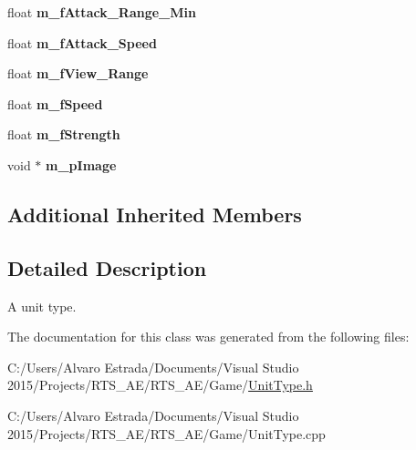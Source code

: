 \begin{DoxyCompactItemize}
\item 
float {\bfseries m\+\_\+f\+Attack\+\_\+\+Range\+\_\+\+Min}\hypertarget{class_c_unit_type_a73c78fc1d0e1d9dfe9adf9e514e7ca8e}{}\label{class_c_unit_type_a73c78fc1d0e1d9dfe9adf9e514e7ca8e}

\item 
float {\bfseries m\+\_\+f\+Attack\+\_\+\+Speed}\hypertarget{class_c_unit_type_ab1367e5b8d1bfc56b0f6943ec82cff84}{}\label{class_c_unit_type_ab1367e5b8d1bfc56b0f6943ec82cff84}

\item 
float {\bfseries m\+\_\+f\+View\+\_\+\+Range}\hypertarget{class_c_unit_type_a772d2059f0ed7cf102d8ed05e9c14f6c}{}\label{class_c_unit_type_a772d2059f0ed7cf102d8ed05e9c14f6c}

\item 
float {\bfseries m\+\_\+f\+Speed}\hypertarget{class_c_unit_type_a82664fdb4c67e87c2a1963a8be498e6a}{}\label{class_c_unit_type_a82664fdb4c67e87c2a1963a8be498e6a}

\item 
float {\bfseries m\+\_\+f\+Strength}\hypertarget{class_c_unit_type_a125ac640042cc979c4bd2184a1f8f15d}{}\label{class_c_unit_type_a125ac640042cc979c4bd2184a1f8f15d}

\item 
void $\ast$ {\bfseries m\+\_\+p\+Image}\hypertarget{class_c_unit_type_a03f57f3533f6afc7fcfe0dae750c3f96}{}\label{class_c_unit_type_a03f57f3533f6afc7fcfe0dae750c3f96}

\end{DoxyCompactItemize}
\subsection*{Additional Inherited Members}


\subsection{Detailed Description}
A unit type. 

The documentation for this class was generated from the following files\+:\begin{DoxyCompactItemize}
\item 
C\+:/\+Users/\+Alvaro Estrada/\+Documents/\+Visual Studio 2015/\+Projects/\+R\+T\+S\+\_\+\+A\+E/\+R\+T\+S\+\_\+\+A\+E/\+Game/\hyperlink{_unit_type_8h}{Unit\+Type.\+h}\item 
C\+:/\+Users/\+Alvaro Estrada/\+Documents/\+Visual Studio 2015/\+Projects/\+R\+T\+S\+\_\+\+A\+E/\+R\+T\+S\+\_\+\+A\+E/\+Game/Unit\+Type.\+cpp\end{DoxyCompactItemize}
